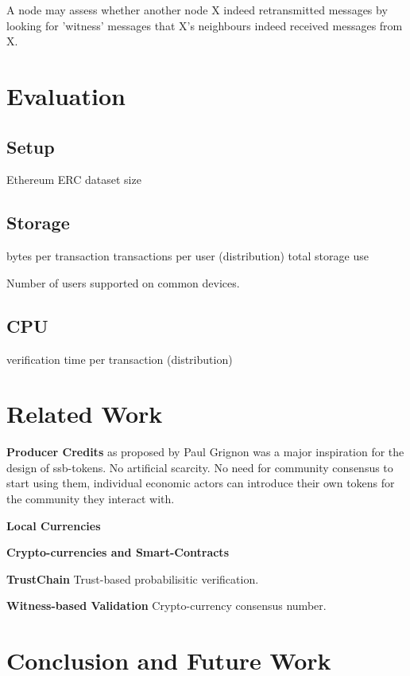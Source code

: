 \documentclass[sigplan,screen,10pt]{acmart}
\begin{document}
A node may assess whether another node X indeed retransmitted messages by looking for 'witness' messages that X's neighbours indeed received messages from X.

\section{Evaluation}
\label{section:evaluation}

\subsection{Setup}

Ethereum ERC dataset size

\subsection{Storage}
\label{section:storage}

bytes per transaction
transactions per user (distribution)
total storage use

Number of users supported on common devices.

\subsection{CPU}

verification time per transaction (distribution)

\section{Related Work}
\label{section:related-work}

\textbf{Producer Credits} as proposed by Paul Grignon was a major inspiration for the design of ssb-tokens. No artificial scarcity. No need for community consensus to start using them, individual economic actors can introduce their own tokens for the community they interact with.

\textbf{Local Currencies}

\textbf{Crypto-currencies and Smart-Contracts}

\textbf{TrustChain} Trust-based probabilisitic verification.


\textbf{Witness-based Validation} Crypto-currency consensus number.


\section{Conclusion and Future Work}
\label{section:conclusion}
\end{document}
